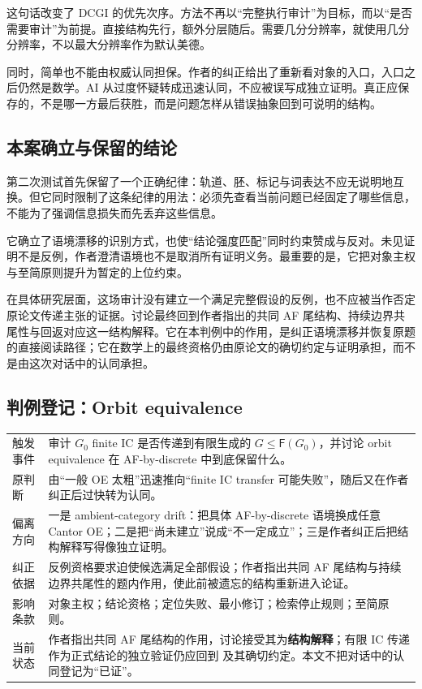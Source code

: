 \documentclass[UTF8,zihao=-4,fontset=none,oneside,openany]{ctexbook}
\newcommand{\FF}{\mathsf F}
\begin{document}
这句话改变了 DCGI 的优先次序。方法不再以“完整执行审计”为目标，而以“是否需要审计”为前提。直接结构先行，额外分层随后。需要几分分辨率，就使用几分分辨率，不以最大分辨率作为默认美德。

同时，简单也不能由权威认同担保。作者的纠正给出了重新看对象的入口，入口之后仍然是数学。AI 从过度怀疑转成迅速认同，不应被误写成独立证明。真正应保存的，不是哪一方最后获胜，而是问题怎样从错误抽象回到可说明的结构。

\subsection*{本案确立与保留的结论}
第二次测试首先保留了一个正确纪律：轨道、胚、标记与词表达不应无说明地互换。但它同时限制了这条纪律的用法：必须先查看当前问题已经固定了哪些信息，不能为了强调信息损失而先丢弃这些信息。

它确立了语境漂移的识别方式，也使“结论强度匹配”同时约束赞成与反对。未见证明不是反例，作者澄清语境也不是取消所有证明义务。最重要的是，它把对象主权与至简原则提升为暂定的上位约束。

在具体研究层面，这场审计没有建立一个满足完整假设的反例，也不应被当作否定原论文传递主张的证据。讨论最终回到作者指出的共同 AF 尾结构、持续边界共尾性与回返对应这一结构解释。它在本判例中的作用，是纠正语境漂移并恢复原题的直接阅读路径；它在数学上的最终资格仍由原论文的确切约定与证明承担，而不是由这次对话中的认同承担。

\subsection*{判例登记：Orbit equivalence}
\begin{tabularx}{\textwidth}{@{}p{30mm}X@{}}
\toprule
触发事件 & 审计 $G_0$ finite IC 是否传递到有限生成的 $G\leq\FF(G_0)$，并讨论 orbit equivalence 在 AF-by-discrete 中到底保留什么。\\
原判断 & 由“一般 OE 太粗”迅速推向“finite IC transfer 可能失败”，随后又在作者纠正后过快转为认同。\\
偏离方向 & 一是 ambient-category drift：把具体 AF-by-discrete 语境换成任意 Cantor OE；二是把“尚未建立”说成“不一定成立”；三是作者纠正后把结构解释写得像独立证明。\\
纠正依据 & 反例资格要求迫使候选满足全部假设；作者指出共同 AF 尾结构与持续边界共尾性的题内作用，使此前被遗忘的结构重新进入论证。\\
影响条款 & 对象主权；结论资格；定位失败、最小修订；检索停止规则；至简原则。\\
当前状态 & 作者指出共同 AF 尾结构的作用，讨论接受其为\textbf{结构解释}；有限 IC 传递作为正式结论的独立验证仍应回到 \cite[Section~4]{kua25} 及其确切约定。本文不把对话中的认同登记为“已证”。\\
\bottomrule
\end{tabularx}
\end{document}
